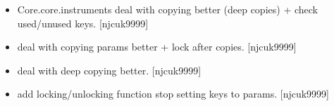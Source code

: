 \documentclass[a4paper,10pt,english]{report}
\begin{document}
\begin{itemize}
\item {} 
Core.core.instruments \sphinxhyphen{} deal with copying better (deep copies) + check
used/unused keys. {[}njcuk9999{]}

\item {} 
 \sphinxhyphen{} deal with copying params better + lock
after copies. {[}njcuk9999{]}

\item {} 
 \sphinxhyphen{} deal with deep copying better. {[}njcuk9999{]}

\item {} 
 \sphinxhyphen{} add locking/unlocking function \sphinxhyphen{}
stop setting keys to params. {[}njcuk9999{]}

\end{itemize}
\end{document}
